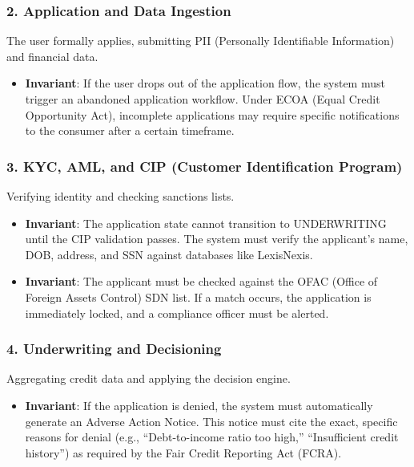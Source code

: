 \documentclass[
  11pt,
  openany,
  oneside]{book}
\providecommand{\tightlist}{%
  \setlength{\itemsep}{0pt}\setlength{\parskip}{0pt}}
\begin{document}
\subsubsection{2. Application and Data
Ingestion}\label{application-and-data-ingestion}

The user formally applies, submitting PII (Personally Identifiable
Information) and financial data.

\begin{itemize}
\tightlist
\item
  \textbf{Invariant}: If the user drops out of the application flow, the
  system must trigger an abandoned application workflow. Under ECOA
  (Equal Credit Opportunity Act), incomplete applications may require
  specific notifications to the consumer after a certain timeframe.
\end{itemize}

\subsubsection{3. KYC, AML, and CIP (Customer Identification
Program)}\label{kyc-aml-and-cip-customer-identification-program}

Verifying identity and checking sanctions lists.

\begin{itemize}
\tightlist
\item
  \textbf{Invariant}: The application state cannot transition to
  UNDERWRITING until the CIP validation passes. The system must verify
  the applicant's name, DOB, address, and SSN against databases like
  LexisNexis.
\item
  \textbf{Invariant}: The applicant must be checked against the OFAC
  (Office of Foreign Assets Control) SDN list. If a match occurs, the
  application is immediately locked, and a compliance officer must be
  alerted.
\end{itemize}

\subsubsection{4. Underwriting and
Decisioning}\label{underwriting-and-decisioning}

Aggregating credit data and applying the decision engine.

\begin{itemize}
\tightlist
\item
  \textbf{Invariant}: If the application is denied, the system must
  automatically generate an Adverse Action Notice. This notice must cite
  the exact, specific reasons for denial (e.g., ``Debt-to-income ratio
  too high,'' ``Insufficient credit history'') as required by the Fair
  Credit Reporting Act (FCRA).
\end{itemize}
\end{document}
